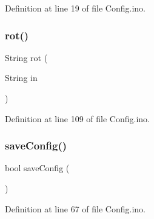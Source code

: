 Definition at line 19 of file Config.\+ino.

\mbox{\label{_config_8ino_a531e35e139960a373d7880a09a0c41ec}} 
\subsubsection{\texorpdfstring{rot()}{rot()}}
{\footnotesize\ttfamily String rot (\begin{DoxyParamCaption}\item[{String}]{in }\end{DoxyParamCaption})}



Definition at line 109 of file Config.\+ino.

\mbox{\label{_config_8ino_a185d7f2d6e216d095034529d9e9d6776}} 
\subsubsection{\texorpdfstring{saveConfig()}{saveConfig()}}
{\footnotesize\ttfamily bool save\+Config (\begin{DoxyParamCaption}{ }\end{DoxyParamCaption})}



Definition at line 67 of file Config.\+ino.

